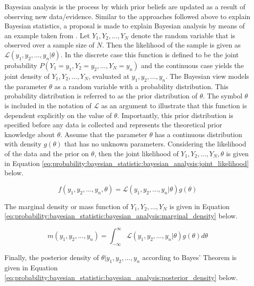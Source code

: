 Bayesian analysis is the process by which prior beliefs are updated as a result of observing new data/evidence. Similar to the approaches followed above to explain Bayesian statistics, a proposal is made to explain Bayesian analysis by means of an example taken from \cite{ref:wackerly:2014}. Let $Y_{1}, Y_{2}, \dots, Y_{N}$ denote the random variable that is observed over a sample size of $N$. Then the likelihood of the sample is given as $\mathcal{L}(y_{1}, y_{2}, \dots, y_{n} \vert \theta)$. In the discrete case this function is defined to be the joint probability $P(Y_{1} = y_{1}, Y_{2} = y_{2}, \dots, Y_{N} = y_{n})$ and the continuous case yields the joint density of $Y_{1}, Y_{2}, \dots, Y_{N}$, evaluated at $y_{1}, y_{2}, \dots, y_{n}$. The Bayesian view models the parameter $\theta$ as a random variable with a probability distribution. This probability distribution is referred to as the prior distribution of $\theta$. The symbol $\theta$ is included in the notation of $\mathcal{L}$ as an argument to illustrate that this function is dependent explicitly on the value of $\theta$. Importantly, this prior distribution is specified before any data is collected and represents the theoretical prior knowledge about $\theta$. Assume that the parameter $\theta$ has a continuous distribution with density $g(\theta)$ that has no unknown parameters. Considering the likelihood of the data and the prior on $\theta$, then the joint likelihood of $Y_{1}, Y_{2}, \dots, Y_{N}, \theta$ is given in Equation \ref{eq:probability:bayesian_statistic:bayesian_analysis:joint_likelihood} below.

\begin{equation}
    \label{eq:probability:bayesian_statistic:bayesian_analysis:joint_likelihood}
    f(y_{1}, y_{2}, \dots, y_{n}, \theta) = \mathcal{L}(y_{1}, y_{2}, \dots, y_{n} \vert \theta)g(\theta)
\end{equation}

The marginal density or mass function of $Y_{1}, Y_{2}, \dots, Y_{N}$ is given in Equation \ref{eq:probability:bayesian_statistic:bayesian_analysis:marginal_density} below.

\begin{equation}
    \label{eq:probability:bayesian_statistic:bayesian_analysis:marginal_density}
    m(y_{1}, y_{2}, \dots, y_{n}) = \int_{-\infty}^{\infty} \mathcal{L}(y_{1}, y_{2}, \dots, y_{n} \vert \theta)g(\theta)d\theta
\end{equation}

Finally, the posterior density of $\theta \vert y_{1}, y_{2}, \dots, y_{n}$ according to Bayes' Theorem is given in Equation \ref{eq:probability:bayesian_statistic:bayesian_analysis:posterior_density} below.

